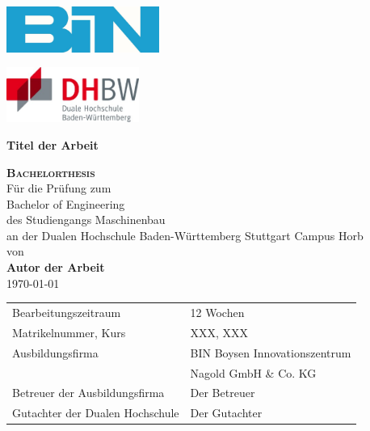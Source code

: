 \thispagestyle{empty}

\begin{minipage}[t l]{0.49\textwidth}
	\includegraphics[height=15mm]{Bilder/logoBIN}
\end{minipage}
%
\begin{minipage}[t r]{0.5\textwidth}
	\begin{flushright}
		\includegraphics[height=18mm]{Bilder/logoDHBW}
	\end{flushright}
\end{minipage}

\vspace{2 cm}
\singlespacing
\begin{center}
	\Large{\textbf{Titel der Arbeit}} \\
\end{center}
\onehalfspacing

\begin{center}
	\vspace{1 cm}
		\textbf{\textsc{Bachelorthesis}}\\
	\vspace{1 cm}
		Für die Prüfung zum\\
		Bachelor of Engineering\\
	\vspace{0,5 cm}
		des Studiengangs Maschinenbau\\
		an der Dualen Hochschule Baden-Württemberg Stuttgart Campus Horb\\
	\vspace{1 cm}
		von\\
		\textbf{Autor der Arbeit}\\
	\vspace{1 cm}
		{\today}
	\vfill
	\begin{tabular}{R{7 cm}L{7 cm}}
  		Bearbeitungszeitraum         & 12 Wochen \\
        Matrikelnummer, Kurs         & XXX, XXX            \\ 
        Ausbildungsfirma             & BIN Boysen Innovationszentrum  \\
        							 & Nagold GmbH \& Co. KG  \\ 
        Betreuer der Ausbildungsfirma& Der Betreuer\\
        Gutachter der Dualen Hochschule& Der Gutachter
	\end{tabular}
\end{center}
